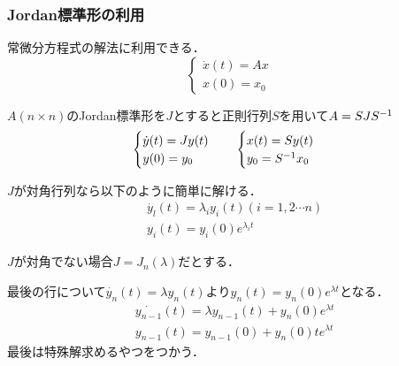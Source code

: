 \subsubsection{Jordan標準形の利用}
常微分方程式の解法に利用できる．
\begin{equation}
  \begin{cases}
    \dot{x}(t)=Ax\\
    x(0)=x_0
  \end{cases}
\end{equation}

$A(n\times n)$のJordan標準形を$J$とすると正則行列$S$を用いて$A=SJ{S}^{-1}$
\begin{equation}
  \begin{cases}
    \dot{y}(t)=Jy(t)\\
    y(0)=y_0
  \end{cases}\ \ \
  \begin{cases}
    x(t)=Sy(t)\\
    y_0 = {S}^{-1}x_0
  \end{cases}
\end{equation}

$J$が対角行列なら以下のように簡単に解ける．
\begin{align}
  &\dot{y_l}(t)={\lambda}_i y_i (t)(i=1,2\cdots n)\\
  &y_i (t)=y_i (0)e^{{\lambda}_i t}
\end{align}

$J$が対角でない場合$J=J_n (\lambda )$だとする．

最後の行について$\dot{y_n}(t)=\lambda y_n (t)よりy_n (t)=y_n (0)e^{\lambda t}$となる．
\begin{align}
  &\dot{y_{n-1}}(t)=\lambda y_{n-1}(t)+y_n (0)e^{\lambda t}\\
  &y_{n-1}(t) = y_{n-1}(0)+y_n (0)t e^{\lambda t}
\end{align}
最後は特殊解求めるやつをつかう．

